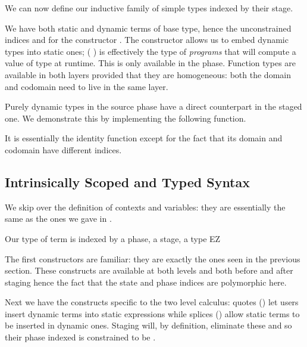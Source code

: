 \documentclass{article}
\begin{document}

We can now define our inductive family of simple types indexed
by their stage.


We have both static and dynamic terms of base type,
hence the unconstrained indices  and 
for the constructor .
%
The constructor  allows us to embed dynamic
types into static ones; ( ) is effectively
the type of \emph{programs} that will compute a value of
type  at runtime. This is only available in the
 phase.
%
Function types are available in both layers provided that
they are homogeneous: both the domain and codomain need
to live in the same layer.

Purely dynamic types in the source phase have a direct
counterpart in the staged one. We demonstrate this by
implementing the following  function.


It is essentially the identity function except for the
fact that its domain and codomain have different indices.

\subsection{Intrinsically Scoped and Typed Syntax}

We skip over the definition of contexts and variables: they
are essentially the same as the ones we gave in .

Our type of term is indexed by a phase, a stage, a type EZ


The first constructors are familiar: they are exactly the ones
seen in the previous section. These constructs are available
at both levels and both before and after staging hence the fact
that the state and phase indices are polymorphic here.


Next we have the constructs specific to the two level calculus:
quotes () let users insert dynamic terms into static
expressions while splices () allow static terms to
be inserted in dynamic ones.
%
Staging will, by definition, eliminate these and so their phase
indexed is constrained to be .
\end{document}
